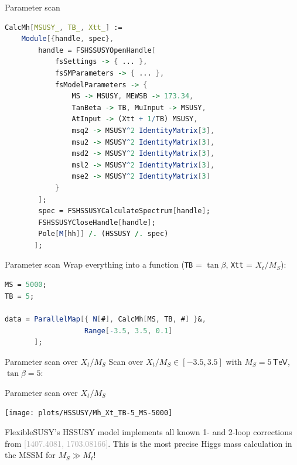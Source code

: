 \documentclass[hyperref={pdfpagelabels=false},ngerman]{beamer}
\newcommand{\eh}[1]{\,\mathsf{#1}}
\newcommand{\MS}{\ensuremath{M_S}}
\newcommand{\bigcite}[1]{\textcolor{darkgray}{[#1]}}
\begin{document}
\begin{frame}{Parameter scan}
  \usebox{\listbox}
\end{frame}

\begin{lrbox}{\listbox}\begin{lstlisting}[language=Mathematica]
CalcMh[MSUSY_, TB_, Xtt_] :=
    Module[{handle, spec},
        handle = FSHSSUSYOpenHandle[
            fsSettings -> { ... },
            fsSMParameters -> { ... },
            fsModelParameters -> {
                MS -> MSUSY, MEWSB -> 173.34,
                TanBeta -> TB, MuInput -> MSUSY,
                AtInput -> (Xtt + 1/TB) MSUSY,
                msq2 -> MSUSY^2 IdentityMatrix[3],
                msu2 -> MSUSY^2 IdentityMatrix[3],
                msd2 -> MSUSY^2 IdentityMatrix[3],
                msl2 -> MSUSY^2 IdentityMatrix[3],
                mse2 -> MSUSY^2 IdentityMatrix[3]
            }
        ];
        spec = FSHSSUSYCalculateSpectrum[handle];
        FSHSSUSYCloseHandle[handle];
        Pole[M[hh]] /. (HSSUSY /. spec)
       ];
\end{lstlisting}\end{lrbox} %

\begin{frame}{Parameter scan}
  Wrap everything into a function (\texttt{TB} = $\tan\beta$, \texttt{Xtt} = $X_t/\MS$):\\[1em]
  \usebox{\listbox}
\end{frame}

\begin{lrbox}{\listbox}\begin{lstlisting}[language=Mathematica]
MS = 5000;
TB = 5;

data = ParallelMap[{ N[#], CalcMh[MS, TB, #] }&,
                   Range[-3.5, 3.5, 0.1]
       ];
\end{lstlisting}\end{lrbox} %

\begin{frame}{Parameter scan over $X_t/\MS$}
  Scan over $X_t/\MS \in [-3.5, 3.5]$ with $\MS = 5\eh{TeV}$, $\tan\beta = 5$:\\[2em]
  \usebox{\listbox}
\end{frame}

\begin{frame}{Parameter scan over $X_t/\MS$}
  \begin{center}
    \texttt{[image: plots/HSSUSY/Mh\_Xt\_TB-5\_MS-5000]}
  \end{center}
  FlexibleSUSY's HSSUSY model implements all known 1- and 2-loop
  corrections from \bigcite{1407.4081, 1703.08166}.  This is the most
  precise Higgs mass calculation in the MSSM for $\MS \gg M_t$!
\end{frame}
\end{document}
